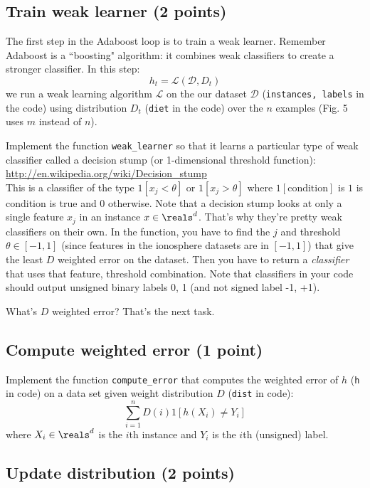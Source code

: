 \documentclass{article}
\begin{document}
\subsection{Train weak learner (2 points)}

The first step in the Adaboost loop is to train a weak learner. Remember Adaboost is a ``boosting" algorithm: it combines weak classifiers 
to create a stronger classifier. In this step:
$$
h_t = \mathcal{L}(\mathcal{D}, D_t)
$$
we run a weak learning algorithm $\mathcal{L}$ on the our dataset $\mathcal{D}$ ({\tt instances, labels} in the code) using distribution
$D_t$ ({\tt diet} in the code) over the $n$ examples (Fig. 5 uses $m$ instead of $n$).

Implement the function {\tt weak\_learner} so that it learns a particular type of weak classifier called a decision stump (or 1-dimensional
threshold function):\\
\url{http://en.wikipedia.org/wiki/Decision\_stump}\\
This is a classifier of the type $1[x_j < \theta]$ or $1[x_j > \theta]$ where $1[\text{condition}]$ is $1$ is condition is true and $0$ otherwise.
Note that a decision stump looks at only a single feature $x_j$ in an instance $x \in \reals^d$. That's why they're pretty weak classifiers
on their own. In the function, you have to find the $j$ and threshold $\theta \in [-1,1]$ (since features in the ionosphere
datasets are in $[-1,1]$) that give the least $D$ weighted error on the dataset. Then you have to return a \emph{classifier}
that uses that feature, threshold combination. Note that classifiers in your code should output unsigned binary labels 0, 1
(and not signed label -1, +1).

What's $D$ weighted error? That's the next task.

\subsection{Compute weighted error (1 point)}

Implement the function {\tt compute\_error} that computes the weighted error of $h$ ({\tt h} in code) on a data set given weight
distribution $D$ ({\tt dist} in code):
$$
\sum_{i=1}^n D(i) 1[h(X_i) \neq Y_i]
$$
where $X_i \in \reals^d$ is the $i$th instance and $Y_i$ is the $i$th (unsigned) label.

\subsection{Update distribution (2 points)}
\end{document}
